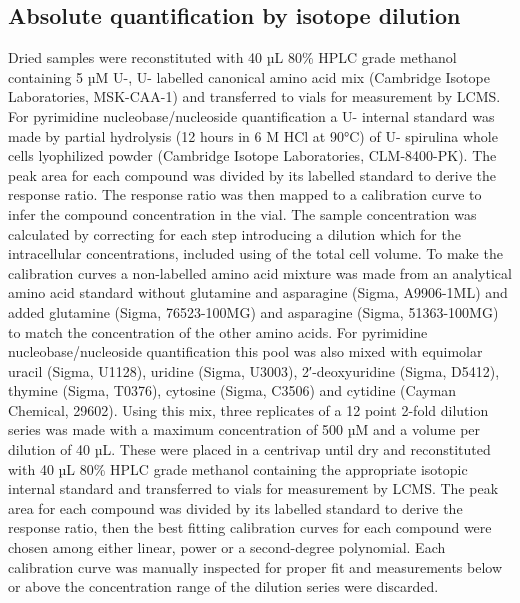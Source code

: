 \subsection{Absolute quantification by isotope dilution}
Dried samples were reconstituted with 40 µL 80\% HPLC grade methanol containing 5 µM U-\hCi, U-\hNi{} labelled canonical amino acid mix (Cambridge Isotope Laboratories, MSK-CAA-1) and transferred to vials for measurement by LCMS.
For pyrimidine nucleobase/nucleoside quantification a U-\hCi{} internal standard was made by partial hydrolysis (12 hours in 6 M HCl at 90°C) of U-\hCi{} spirulina whole cells lyophilized powder (Cambridge Isotope Laboratories, CLM-8400-PK).
The peak area for each compound was divided by its labelled standard to derive the response ratio.
The response ratio was then mapped to a calibration curve to infer the compound concentration in the vial.
The sample concentration was calculated by correcting for each step introducing a dilution which for the intracellular concentrations, included using of the total cell volume.
To make the calibration curves a non-labelled amino acid mixture was made from an analytical amino acid standard without glutamine and asparagine (Sigma, A9906-1ML) and added glutamine (Sigma, 76523-100MG) and asparagine (Sigma, 51363-100MG) to match the concentration of the other amino acids.
For pyrimidine nucleobase/nucleoside quantification this pool was also mixed with equimolar
uracil (Sigma, U1128),
uridine (Sigma, U3003),
2′-deoxyuridine (Sigma, D5412),
thymine (Sigma, T0376),
cytosine (Sigma, C3506)
and cytidine (Cayman Chemical, 29602).
Using this mix, three replicates of a 12 point 2-fold dilution series was made with a maximum concentration of 500 µM and a volume per dilution of 40 µL.
These were placed in a centrivap until dry and reconstituted with 40 µL 80\% HPLC grade methanol containing the appropriate isotopic internal standard and transferred to vials for measurement by LCMS.
The peak area for each compound was divided by its labelled standard to derive the response ratio, then the best fitting calibration curves for each compound were chosen among either linear, power or a second-degree polynomial.
Each calibration curve was manually inspected for proper fit and measurements below or above the concentration range of the dilution series were discarded.


